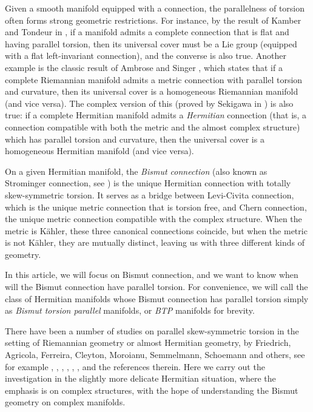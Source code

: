 \documentclass{amsart}
\numberwithin{equation}{section}
\theoremstyle{definition}
\renewcommand{\1}{\mathds{1}}
\renewcommand{\>}{\rightarrow}
\begin{document}
Given a smooth manifold equipped with a connection, the parallelness of torsion often forms strong geometric restrictions. For instance, by the  result of Kamber and Tondeur in \cite{KT}, if a manifold admits a complete connection that is flat and having parallel torsion, then its universal cover must be a Lie group (equipped with a flat left-invariant connection), and the converse is also true. Another example is the classic result of Ambrose and Singer \cite{AS}, which states that if a complete Riemannian manifold admits a metric connection with parallel torsion and curvature, then its universal cover is a homogeneous Riemannian manifold (and vice versa). The complex version of this (proved by Sekigawa in \cite{Sekigawa}) is also true: if a complete Hermitian manifold admits a {\em Hermitian} connection (that is, a connection compatible with both the metric and the almost complex structure) which has parallel torsion and curvature, then the universal cover is a homogeneous Hermitian manifold (and vice versa).

On a given Hermitian manifold, the {\em Bismut connection} (also known as Strominger connection, see \cite{Bismut,Strominger}) is the unique Hermitian connection with totally skew-symmetric torsion. It serves as a bridge between Levi-Civita connection, which is the unique metric connection that is torsion free, and Chern connection, the unique metric connection compatible with the complex structure. When the metric is K\"ahler, these three canonical connections coincide, but when the metric is not K\"ahler, they are mutually distinct, leaving us with three different kinds of geometry.

In this article, we will focus on Bismut connection, and we want to know when will the Bismut connection have parallel torsion. For convenience, we will call the class of Hermitian manifolds whose Bismut connection has parallel torsion simply as {\em Bismut torsion parallel} manifolds, or {\em BTP} manifolds for brevity.

There have been a number  of studies on parallel skew-symmetric torsion in the setting of Riemannian geometry or almost Hermitian geometry, by Friedrich, Agricola, Ferreira, Cleyton, Moroianu, Semmelmann, Schoemann and others, see for example \cite{AF04}, \cite{AF14}, \cite{AFF}, \cite{AFS}, \cite{AFK}, \cite{CMS}, \cite{Sch} and the references therein. Here we carry out the investigation in the slightly more delicate Hermitian situation, where the emphasis is on complex structures, with the hope of understanding the Bismut geometry on complex manifolds.
\end{document}
